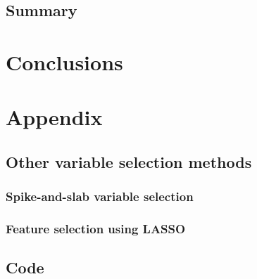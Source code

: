 \documentclass[12pt,letterpaper]{article}
\numberwithin{equation}{subsection}
\begin{document}

\subsection{Summary}

\pagebreak

\section{Conclusions}
\pagebreak
\section{Appendix}
\subsection{Other variable selection methods}
\subsubsection{Spike-and-slab variable selection}
\subsubsection{Feature selection using LASSO}
\pagebreak
\subsection{Code}
\pagebreak
\end{document}

